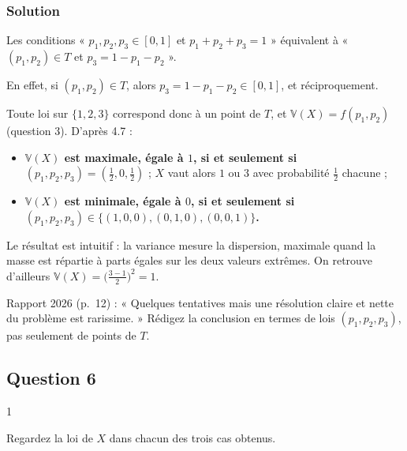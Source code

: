 \documentclass[11pt,a4paper]{article}
\providecommand{\tightlist}{\setlength{\itemsep}{0pt}\setlength{\parskip}{0pt}}
\begin{document}
\hypertarget{solution-40}{%
\subsubsection{Solution}\label{solution-40}}

Les conditions « \(p_1,p_2,p_3\in[0,1]\) et \(p_1+p_2+p_3=1\) » équivalent à « \((p_1,p_2)\in T\) et \(p_3=1-p_1-p_2\) ».

En effet, si \((p_1,p_2)\in T\), alors \(p_3=1-p_1-p_2\in[0,1]\), et réciproquement.

Toute loi sur \(\{1,2,3\}\) correspond donc à un point de \(T\), et \(\mathbb V(X)=f(p_1,p_2)\) (question 3). D'après 4.7 :

\begin{itemize}
\tightlist
\item
  \textbf{\(\mathbb V(X)\) est maximale, égale à \(1\), si et seulement si \((p_1,p_2,p_3)=(\frac12,0,\frac12)\)} ;
  \(X\) vaut alors \(1\) ou \(3\) avec probabilité \(\frac12\) chacune ;
\item
  \textbf{\(\mathbb V(X)\) est minimale, égale à \(0\), si et seulement si \((p_1,p_2,p_3)\in\{(1,0,0),(0,1,0),(0,0,1)\}\).}
\end{itemize}

\begin{methode}

Le résultat est intuitif : la variance mesure la dispersion, maximale quand la masse est répartie à parts égales sur les deux valeurs extrêmes. On retrouve d'ailleurs \(\mathbb V(X)=\bigl(\frac{3-1}{2}\bigr)^2=1\).

\end{methode}

\begin{jury}

Rapport 2026 (p.~12) : « Quelques tentatives mais une résolution claire et nette du problème est rarissime. » Rédigez la conclusion en termes de lois \((p_1,p_2,p_3)\), pas seulement de points de \(T\).

\end{jury}

\hypertarget{question-6}{%
\subsection{Question 6}\label{question-6}}

\begin{indication}{1}

Regardez la loi de \(X\) dans chacun des trois cas obtenus.

\end{indication}
\end{document}
